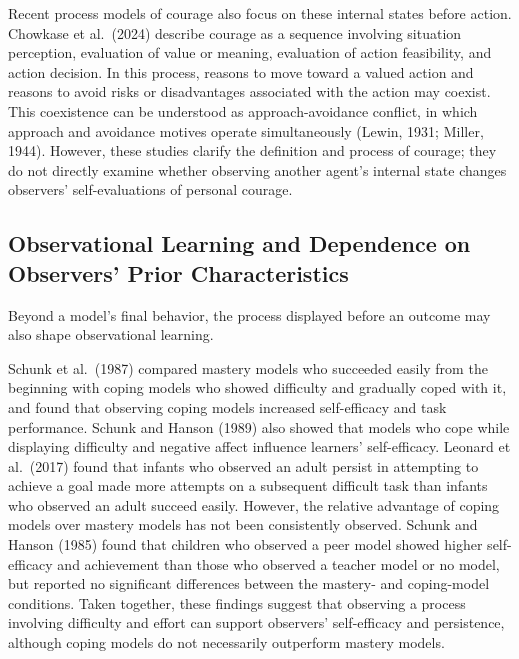 \documentclass[utf8]{FrontiersinHarvard}
\begin{document}
Recent process models of courage also focus on these internal states before action. Chowkase et al.~(2024) describe courage as a sequence involving situation perception, evaluation of value or meaning, evaluation of action feasibility, and action decision. In this process, reasons to move toward a valued action and reasons to avoid risks or disadvantages associated with the action may coexist. This coexistence can be understood as approach-avoidance conflict, in which approach and avoidance motives operate simultaneously (Lewin, 1931; Miller, 1944). However, these studies clarify the definition and process of courage; they do not directly examine whether observing another agent's internal state changes observers' self-evaluations of personal courage.

\subsection{Observational Learning and Dependence on Observers' Prior Characteristics}\label{observational-learning-and-dependence-on-observers-prior-characteristics}

Beyond a model's final behavior, the process displayed before an outcome may also shape observational learning.

Schunk et al.~(1987) compared mastery models who succeeded easily from the beginning with coping models who showed difficulty and gradually coped with it, and found that observing coping models increased self-efficacy and task performance. Schunk and Hanson (1989) also showed that models who cope while displaying difficulty and negative affect influence learners' self-efficacy. Leonard et al.~(2017) found that infants who observed an adult persist in attempting to achieve a goal made more attempts on a subsequent difficult task than infants who observed an adult succeed easily. However, the relative advantage of coping models over mastery models has not been consistently observed. Schunk and Hanson (1985) found that children who observed a peer model showed higher self-efficacy and achievement than those who observed a teacher model or no model, but reported no significant differences between the mastery- and coping-model conditions. Taken together, these findings suggest that observing a process involving difficulty and effort can support observers' self-efficacy and persistence, although coping models do not necessarily outperform mastery models.
\end{document}
